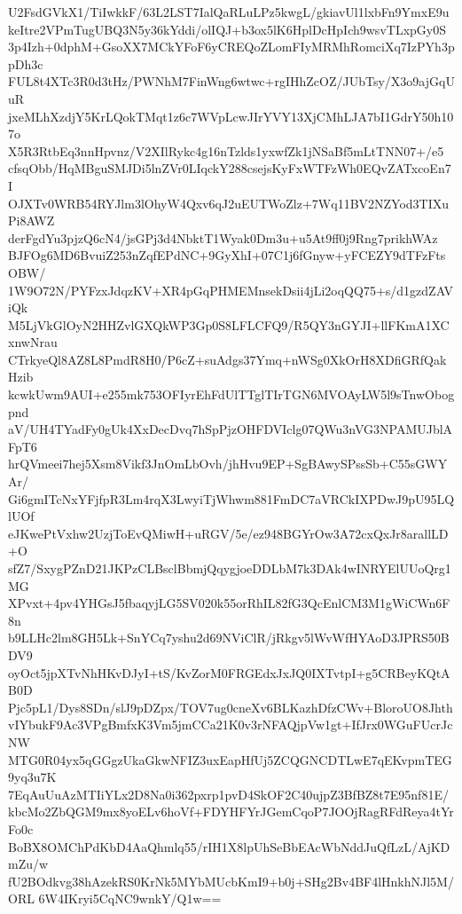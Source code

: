 U2FsdGVkX1/TiIwkkF/63L2LST7IalQaRLuLPz5kwgL/gkiavUl1lxbFn9YmxE9u
keItre2VPmTugUBQ3N5y36kYddi/olIQJ+b3ox5lK6HplDcHpIch9wsvTLxpGy0S
3p4Izh+0dphM+GsoXX7MCkYFoF6yCREQoZLomFIyMRMhRomciXq7IzPYh3ppDh3c
FUL8t4XTc3R0d3tHz/PWNhM7FinWng6wtwc+rgIHhZcOZ/JUbTsy/X3o9ajGqUuR
jxeMLhXzdjY5KrLQokTMqt1z6c7WVpLcwJIrYVY13XjCMhLJA7bI1GdrY50h107o
X5R3RtbEq3nnHpvnz/V2XIlRykc4g16nTzlds1yxwfZk1jNSaBf5mLtTNN07+/e5
cfsqObb/HqMBguSMJDi5lnZVr0LIqckY288csejsKyFxWTFzWh0EQvZATxcoEn7I
OJXTv0WRB54RYJlm3lOhyW4Qxv6qJ2uEUTWoZlz+7Wq11BV2NZYod3TIXuPi8AWZ
derFgdYu3pjzQ6cN4/jsGPj3d4NbktT1Wyak0Dm3u+u5At9ff0j9Rng7prikhWAz
BJFOg6MD6BvuiZ253nZqfEPdNC+9GyXhI+07C1j6fGnyw+yFCEZY9dTFzFtsOBW/
1W9O72N/PYFzxJdqzKV+XR4pGqPHMEMnsekDsii4jLi2oqQQ75+s/d1gzdZAViQk
M5LjVkGlOyN2HHZvlGXQkWP3Gp0S8LFLCFQ9/R5QY3nGYJI+llFKmA1XCxnwNrau
CTrkyeQl8AZ8L8PmdR8H0/P6cZ+suAdgs37Ymq+nWSg0XkOrH8XDfiGRfQakHzib
kcwkUwm9AUI+e255mk753OFIyrEhFdUlTTglTIrTGN6MVOAyLW5l9sTnwObogpnd
aV/UH4TYadFy0gUk4XxDecDvq7hSpPjzOHFDVIclg07QWu3nVG3NPAMUJblAFpT6
hrQVmeei7hej5Xsm8Vikf3JnOmLbOvh/jhHvu9EP+SgBAwySPssSb+C55sGWYAr/
Gi6gmITcNxYFjfpR3Lm4rqX3LwyiTjWhwm881FmDC7aVRCkIXPDwJ9pU95LQlUOf
eJKwePtVxhw2UzjToEvQMiwH+uRGV/5e/ez948BGYrOw3A72cxQxJr8arallLD+O
sfZ7/SxygPZnD21JKPzCLBsclBbmjQqygjoeDDLbM7k3DAk4wINRYElUUoQrg1MG
XPvxt+4pv4YHGsJ5fbaqyjLG5SV020k55orRhIL82fG3QcEnlCM3M1gWiCWn6F8n
b9LLHc2lm8GH5Lk+SnYCq7yshu2d69NViClR/jRkgv5lWvWfHYAoD3JPRS50BDV9
oyOct5jpXTvNhHKvDJyI+tS/KvZorM0FRGEdxJxJQ0IXTvtpI+g5CRBeyKQtAB0D
Pjc5pL1/Dys8SDn/slJ9pDZpx/TOV7ug0cneXv6BLKazhDfzCWv+BloroUO8Jhth
vIYbukF9Ac3VPgBmfxK3Vm5jmCCa21K0v3rNFAQjpVw1gt+IfJrx0WGuFUcrJcNW
MTG0R04yx5qGGgzUkaGkwNFIZ3uxEapHfUj5ZCQGNCDTLwE7qEKvpmTEG9yq3u7K
7EqAuUuAzMTIiYLx2D8Na0i362pxrp1pvD4SkOF2C40ujpZ3BfBZ8t7E95nf81E/
kbcMo2ZbQGM9mx8yoELv6hoVf+FDYHFYrJGemCqoP7JOOjRagRFdReya4tYrFo0c
BoBX8OMChPdKbD4AaQhmlq55/rIH1X8lpUhSeBbEAcWbNddJuQfLzL/AjKDmZu/w
fU2BOdkvg38hAzekRS0KrNk5MYbMUcbKmI9+b0j+SHg2Bv4BF4lHnkhNJl5M/ORL
6W4IKryi5CqNC9wnkY/Q1w==
